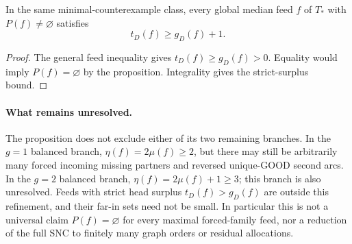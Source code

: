 \begin{corollary}
\label{cor:forced-minimal-far-in-head-surplus}
In the same minimal-counterexample class, every global median feed $f$
of $T_*$ with $P(f)\ne\varnothing$ satisfies
\[
 t_D(f)\ge g_D(f)+1.
\]
\end{corollary}
\begin{proof}
The general feed inequality gives $t_D(f)\ge g_D(f)>0$.
Equality would imply $P(f)=\varnothing$ by the proposition.
Integrality gives the strict-surplus bound.
\end{proof}

\paragraph{What remains unresolved.}
The proposition does not exclude either of its two remaining branches.
In the $g=1$ balanced branch, $\eta(f)=2\mu(f)\ge2$, but there may still be
arbitrarily many forced incoming missing partners and reversed unique-GOOD
second arcs. In the $g=2$ balanced branch, $\eta(f)=2\mu(f)+1\ge3$;
this branch is also unresolved. Feeds with strict head surplus
$t_D(f)>g_D(f)$ are outside this refinement, and their far-in sets
need not be small. In particular this is not a universal claim
$P(f)=\varnothing$ for every
maximal forced-family feed, nor a reduction of the full SNC to finitely
many graph orders or residual allocations.
